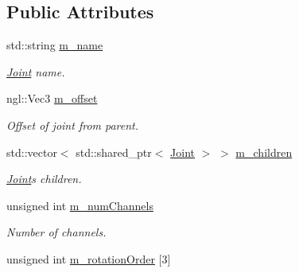 \subsection*{Public Attributes}
\begin{DoxyCompactItemize}
\item 
std\+::string \hyperlink{struct_joint_a8e18a6ff656bcf26a85311ab5f57162a}{m\+\_\+name}\hypertarget{struct_joint_a8e18a6ff656bcf26a85311ab5f57162a}{}\label{struct_joint_a8e18a6ff656bcf26a85311ab5f57162a}

\begin{DoxyCompactList}\small\item\em \hyperlink{struct_joint}{Joint} name. \end{DoxyCompactList}\item 
ngl\+::\+Vec3 \hyperlink{struct_joint_a3256ef7fd0c451027678eb2c496de910}{m\+\_\+offset}\hypertarget{struct_joint_a3256ef7fd0c451027678eb2c496de910}{}\label{struct_joint_a3256ef7fd0c451027678eb2c496de910}

\begin{DoxyCompactList}\small\item\em Offset of joint from parent. \end{DoxyCompactList}\item 
std\+::vector$<$ std\+::shared\+\_\+ptr$<$ \hyperlink{struct_joint}{Joint} $>$ $>$ \hyperlink{struct_joint_a73c03b295b912008537b469709ec97e8}{m\+\_\+children}\hypertarget{struct_joint_a73c03b295b912008537b469709ec97e8}{}\label{struct_joint_a73c03b295b912008537b469709ec97e8}

\begin{DoxyCompactList}\small\item\em \hyperlink{struct_joint}{Joint}\textquotesingle{}s children. \end{DoxyCompactList}\item 
unsigned int \hyperlink{struct_joint_a6f82de576c221aadc4f429ab0144de84}{m\+\_\+num\+Channels}\hypertarget{struct_joint_a6f82de576c221aadc4f429ab0144de84}{}\label{struct_joint_a6f82de576c221aadc4f429ab0144de84}

\begin{DoxyCompactList}\small\item\em Number of channels. \end{DoxyCompactList}\item 
unsigned int \hyperlink{struct_joint_a8e564309dc873b82e2883e37f628a847}{m\+\_\+rotation\+Order} \mbox{[}3\mbox{]}\hypertarget{struct_joint_a8e564309dc873b82e2883e37f628a847}{}\label{struct_joint_a8e564309dc873b82e2883e37f628a847}


\end{DoxyCompactItemize}
